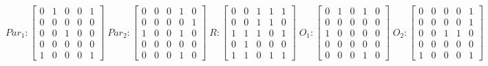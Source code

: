      $$
        Par_{1} : \begin{bmatrix}
            0 & 1 & 0 & 0 & 1 \\
            0 & 0 & 0 & 0 & 0 \\
            0 & 0 & 1 & 0 & 0 \\
			0 & 0 & 0 & 0 & 0 \\
            1 & 0 & 0 & 0 & 1 
        \end{bmatrix}
        \;
        Par_{2} : \begin{bmatrix}
            0 & 0 & 0 & 1 & 0 \\
            0 & 0 & 0 & 0 & 1 \\
            1 & 0 & 0 & 1 & 0 \\
            0 & 0 & 0 & 0 & 0 \\
            0 & 0 & 0 & 1 & 0
        \end{bmatrix}
        \;
        R : \begin{bmatrix}
            0 & 0 & 1 & 1 & 1 \\
            0 & 0 & 1 & 1 & 0 \\
            1 & 1 & 1 & 0 & 1 \\
            0 & 1 & 0 & 0 & 0 \\
            1 & 1 & 0 & 1 & 1
        \end{bmatrix}
        \;
        O_{1} : \begin{bmatrix}
            0 & 1 & 0 & 1 & 0 \\
            0 & 0 & 0 & 0 & 0 \\
            1 & 0 & 0 & 0 & 0 \\
            0 & 0 & 0 & 0 & 0 \\
            0 & 0 & 0 & 1 & 0
        \end{bmatrix}
        \;
        O_{2} : \begin{bmatrix}
            0 & 0 & 0 & 0 & 1 \\
            0 & 0 & 0 & 0 & 1 \\
            0 & 0 & 1 & 1 & 0 \\
            0 & 0 & 0 & 0 & 0 \\
            1 & 0 & 0 & 0 & 1
        \end{bmatrix}
    $$ 
